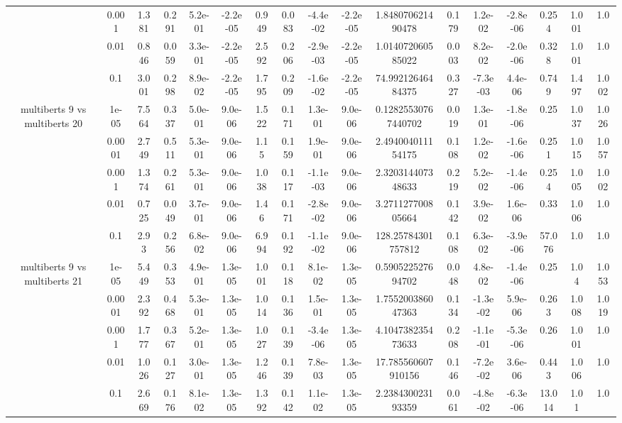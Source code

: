 \begin{tabular}{|c|c|c|c|c|c|c|c|c|c|c|c|c|c|c|c|c|}
 & 0.001 & 1.381 & 0.291 & 5.2e-01 & -2.2e-05 & 0.949 & 0.083 & -4.4e-02 & -2.2e-05 & 1.848070621490478 & 0.179 & 1.2e-02 & -2.8e-06 & 0.254 & 1.001 & 1.0 \\
 & 0.01 & 0.846 & 0.059 & 3.3e-01 & -2.2e-05 & 2.592 & 0.206 & -2.9e-03 & -2.2e-05 & 1.014072060585022 & 0.003 & 8.2e-02 & -2.0e-06 & 0.328 & 1.001 & 1.0 \\
 & 0.1 & 3.001 & 0.298 & 8.9e-02 & -2.2e-05 & 1.795 & 0.209 & -1.6e-02 & -2.2e-05 & 74.99212646484375 & 0.327 & -7.3e-03 & 4.4e-06 & 0.749 & 1.497 & 1.002 \\
\hline
\multirow{5}{*}{multiberts 9 vs multiberts 20} & 1e-05 & 7.564 & 0.337 & 5.0e-01 & 9.0e-06 & 1.522 & 0.171 & 1.3e-01 & 9.0e-06 & 0.12825530767440702 & 0.019 & 1.3e-01 & -1.8e-06 & 0.25 & 1.037 & 1.026 \\
 & 0.0001 & 2.749 & 0.511 & 5.3e-01 & 9.0e-06 & 1.15 & 0.159 & 1.9e-01 & 9.0e-06 & 2.494004011154175 & 0.108 & 1.2e-02 & -1.6e-06 & 0.251 & 1.015 & 1.057 \\
 & 0.001 & 1.374 & 0.261 & 5.3e-01 & 9.0e-06 & 1.038 & 0.117 & -1.1e-03 & 9.0e-06 & 2.320314407348633 & 0.219 & 5.2e-02 & -1.4e-06 & 0.254 & 1.005 & 1.002 \\
 & 0.01 & 0.725 & 0.049 & 3.7e-01 & 9.0e-06 & 1.46 & 0.171 & -2.8e-02 & 9.0e-06 & 3.271127700805664 & 0.142 & 3.9e-02 & 1.6e-06 & 0.33 & 1.006 & 1.0 \\
 & 0.1 & 2.93 & 0.256 & 6.8e-02 & 9.0e-06 & 6.994 & 0.192 & -1.1e-02 & 9.0e-06 & 128.25784301757812 & 0.108 & 6.3e-02 & -3.9e-06 & 57.076 & 1.0 & 1.0 \\
\hline
\multirow{5}{*}{multiberts 9 vs multiberts 21} & 1e-05 & 5.449 & 0.353 & 4.9e-01 & 1.3e-05 & 1.001 & 0.118 & 8.1e-02 & 1.3e-05 & 0.590522527694702 & 0.048 & 4.8e-02 & -1.4e-06 & 0.25 & 1.04 & 1.053 \\
 & 0.0001 & 2.392 & 0.468 & 5.3e-01 & 1.3e-05 & 1.014 & 0.136 & 1.5e-01 & 1.3e-05 & 1.755200386047363 & 0.134 & -1.3e-02 & 5.9e-06 & 0.263 & 1.008 & 1.019 \\
 & 0.001 & 1.777 & 0.367 & 5.2e-01 & 1.3e-05 & 1.027 & 0.139 & -3.4e-06 & 1.3e-05 & 4.104738235473633 & 0.208 & -1.1e-01 & -5.3e-06 & 0.26 & 1.001 & 1.0 \\
 & 0.01 & 1.026 & 0.127 & 3.0e-01 & 1.3e-05 & 1.246 & 0.139 & 7.8e-03 & 1.3e-05 & 17.785560607910156 & 0.146 & -7.2e-02 & 3.6e-06 & 0.443 & 1.006 & 1.0 \\
 & 0.1 & 2.669 & 0.176 & 8.1e-02 & 1.3e-05 & 1.392 & 0.142 & 1.1e-02 & 1.3e-05 & 2.238430023193359 & 0.061 & -4.8e-02 & -6.3e-06 & 13.014 & 1.01 & 1.0 \\

\end{tabular}
